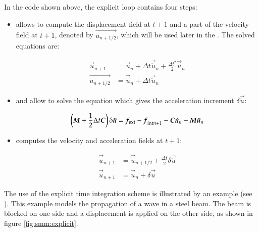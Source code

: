 In the code shown above, the explicit loop contains four steps:
\begin{itemize}
\item {}  allows to  compute the displacement  field at
  $t+1$   and   a  part   of   the  velocity   field   at   $t+1$,  denoted   by
  $\vec{\dot{u}_{n+1/2}}$,    which    will     be    used    later    in    the
  . The solved equations are:

  \begin{align}
    \vec{u}_{n+1}  &= \vec{u}_{n}  + \Delta  t \vec{\dot{u}}_{n}  + \frac{\Delta
      t^2}{2} \vec{\ddot{u}}_{n}\\
    \vec{\dot{u}_{n+1/2}}  &= \vec{\dot{u}}_{n} +  \Delta t  \vec{\ddot{u}}_{n}
    \label{eqn:smm:explicit:onehalfvelocity}
  \end{align}

\item {}  and  allow
  to  solve  the  equation   which  gives  the  acceleration  increment  $\delta
  \vec{\ddot{u}}$:

  \begin{equation}
    \left(\boldsymbol{M}  +  \frac{1}{2}  \Delta  t \boldsymbol{C}\right)  \delta  \boldsymbol{\ddot{u}}  =
    \boldsymbol{f_{{\mathrm{ext}}}} -  \boldsymbol{f}_{{\mathrm{int}}n+1} - \boldsymbol{C}  \boldsymbol{\dot{u}}_{n} -
    \boldsymbol{M} \boldsymbol{\ddot{u}}_{n}
  \end{equation}


\item {} computes  the velocity and acceleration fields
  at $t+1$:

  \begin{align}
    \vec{\dot{u}}_{n+1}  &= \vec{\dot{u}}_{n+1/2} + \frac{\Delta t}{2} \delta \vec{\ddot{u}} \\
    \vec{\ddot{u}}_{n+1}  &= \vec{\ddot{u}}_{n} +  \delta \vec{\ddot{u}}
  \end{align}
\end{itemize}

The use  of the explicit  time integration scheme  is illustrated by  an example
(see  ).    This  example  models  the
propagation of  a wave in a  steel beam. The beam  is blocked on one  side and a
displacement   is   applied   on   the   other  side,   as   shown   in   figure
\ref{fig:smm:explicit}.

